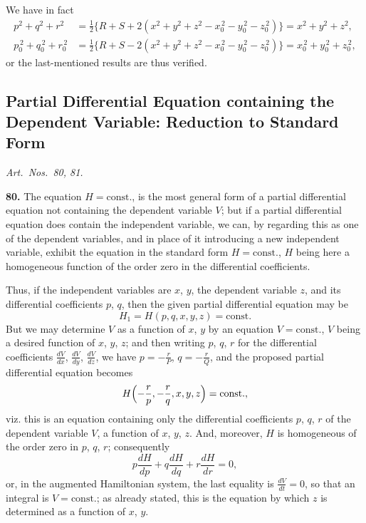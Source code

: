 \documentclass[11pt,a4paper]{book}
\begin{document}
We have in fact
\begin{align*}
p^2 + q^2 + r^2 &= \tfrac{1}{2}\{R + S + 2(x^2 + y^2 + z^2 - x_0^{\,2} - y_0^{\,2} - z_0^{\,2})\} = x^2 + y^2 + z^2, \\
p_0^{\,2} + q_0^{\,2} + r_0^{\,2} &= \tfrac{1}{2}\{R + S - 2(x^2 + y^2 + z^2 - x_0^{\,2} - y_0^{\,2} - z_0^{\,2})\} = x_0^{\,2} + y_0^{\,2} + z_0^{\,2},
\end{align*}
or the last-mentioned results are thus verified.

\medskip

\subsection*{Partial Differential Equation containing the Dependent Variable: Reduction to Standard Form}
\textit{Art.~Nos.~80, 81.}

\smallskip

\noindent\textbf{80.} The equation $H = \text{const.}$, is the most general form of a partial differential equation not containing the dependent variable $V$; but if a partial differential equation does contain the independent variable, we can, by regarding this as one of the dependent variables, and in place of it introducing a new independent variable, exhibit the equation in the standard form $H = \text{const.}$, $H$ being here a homogeneous function of the order zero in the differential coefficients.

Thus, if the independent variables are $x$, $y$, the dependent variable $z$, and its differential coefficients $p$, $q$, then the given partial differential equation may be
\[
H_1 = H(p, q, x, y, z) = \text{const.}
\]
But we may determine $V$ as a function of $x$, $y$ by an equation $V = \text{const.}$, $V$ being a desired function of $x$, $y$, $z$; and then writing $p$, $q$, $r$ for the differential coefficients $\frac{dV}{dx}$, $\frac{dV}{dy}$, $\frac{dV}{dz}$, we have $p = -\frac{r}{P}$, $q = -\frac{r}{Q}$, and the proposed partial differential equation becomes
\[
H\Bigl(-\frac{r}{p}, -\frac{r}{q}, x, y, z\Bigr) = \text{const.},
\]
viz. this is an equation containing only the differential coefficients $p$, $q$, $r$ of the dependent variable $V$, a function of $x$, $y$, $z$. And, moreover, $H$ is homogeneous of the order zero in $p$, $q$, $r$; consequently
\[
p\frac{dH}{dp} + q\frac{dH}{dq} + r\frac{dH}{dr} = 0,
\]
or, in the augmented Hamiltonian system, the last equality is $\frac{dV}{dt} = 0$, so that an integral is $V = \text{const.}$; as already stated, this is the equation by which $z$ is determined as a function of $x$, $y$.
\end{document}
